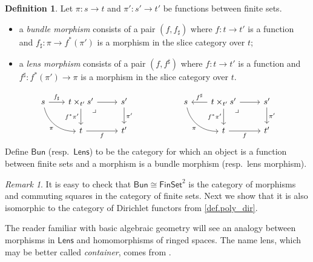 \documentclass[11pt, article, one side]{memoir}
\theoremstyle{theorem}
\theoremstyle{definition}
\newtheorem{definition}[equation]{Definition}
\theoremstyle{remark}
\newtheorem{remark}[equation]{Remark}
\newcommand{\Cat}[1]{\mathsf{#1}}%
\newcommand{\finset}{\Cat{FinSet}}
\newcommand{\lens}{\Cat{Lens}}
\newcommand{\bun}{\Cat{Bun}}
\begin{document}
\begin{definition}\label{def.sheaves_bundles}
Let $\pi\colon s\to t$ and $\pi'\colon s'\to t'$ be functions between finite sets.
\begin{itemize}
	\item a \emph{bundle morphism} consists of a pair $(f,f_\sharp)$ where $f\colon t\to t'$ is a function and $f_\sharp\colon \pi\to f^*(\pi')$ is a morphism in the slice category over $t$;
	\item a \emph{lens morphism} consists of a pair $(f,f^\sharp)$ where $f\colon t\to t'$ is a function and $f^\sharp\colon f^*(\pi')\to \pi$ is a morphism in the slice category over $t$.
\end{itemize}
\[
\begin{tikzcd}
s\ar[dr, bend right=40pt, "\pi"']&[-5pt]
t\times_{t'}s'\ar[r]\ar[d, "f^*\pi'"']\ar[from=l, "f_\sharp"]&
s'\ar[d, "\pi'"]\\&
t\ar[r, "f"']&
t'\ar[ul, phantom, very near end, "\lrcorner"]
\end{tikzcd}
\hspace{.75in}
\begin{tikzcd}
s\ar[dr, bend right=40pt, "\pi"']&[-5pt]
t\times_{t'}s'\ar[r]\ar[d, "f^*\pi'"']\ar[l, "f^\sharp"']&
s'\ar[d, "\pi'"]\\&
t\ar[r, "f"']&
t'\ar[ul, phantom, very near end, "\lrcorner"]
\end{tikzcd}
\]
Define $\bun$ (resp.\ $\lens$) to be the category for which an object is a function between finite sets and a morphism is a bundle morphism (resp.\ lens morphism).
\end{definition}

\begin{remark}
It is easy to check that $\bun\cong\finset^2$ is the category of morphisms and commuting squares in the category of finite sets. Next we show that it is also isomorphic to the category of Dirichlet functors from \cref{def.poly_dir}.

The reader familiar with basic algebraic geometry will see an analogy between morphisms in $\lens$ and homomorphisms of ringed spaces. The name lens, which may be better called \emph{container}, comes from \cite{Spivak}.
\end{remark}
\end{document}
